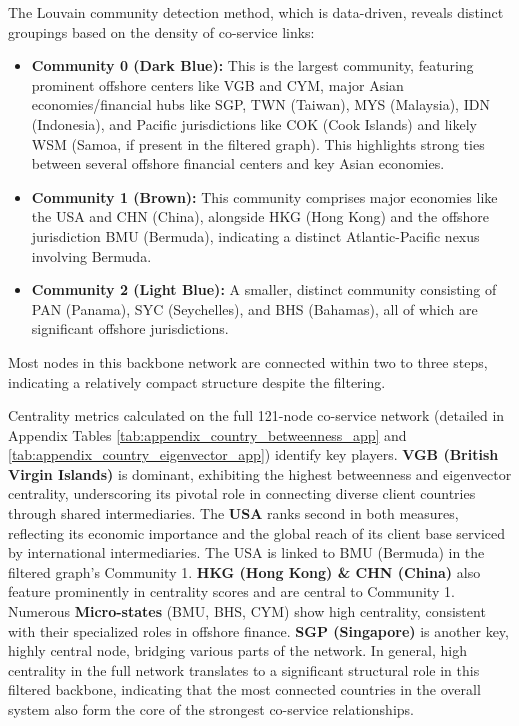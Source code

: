The Louvain community detection method, which is data-driven, reveals distinct groupings based on the density of co-service links:
\begin{itemize}
    \item \textbf{Community 0 (Dark Blue):} This is the largest community, featuring prominent offshore centers like VGB and CYM, major Asian economies/financial hubs like SGP, TWN (Taiwan), MYS (Malaysia), IDN (Indonesia), and Pacific jurisdictions like COK (Cook Islands) and likely WSM (Samoa, if present in the filtered graph). This highlights strong ties between several offshore financial centers and key Asian economies.
    \item \textbf{Community 1 (Brown):} This community comprises major economies like the USA and CHN (China), alongside HKG (Hong Kong) and the offshore jurisdiction BMU (Bermuda), indicating a distinct Atlantic-Pacific nexus involving Bermuda.
    \item \textbf{Community 2 (Light Blue):} A smaller, distinct community consisting of PAN (Panama), SYC (Seychelles), and BHS (Bahamas), all of which are significant offshore jurisdictions.
\end{itemize}
Most nodes in this backbone network are connected within two to three steps, indicating a relatively compact structure despite the filtering.

Centrality metrics calculated on the full 121-node co-service network (detailed in Appendix Tables \ref{tab:appendix_country_betweenness_app} and \ref{tab:appendix_country_eigenvector_app}) identify key players.
\textbf{VGB (British Virgin Islands)} is dominant, exhibiting the highest betweenness and eigenvector centrality, underscoring its pivotal role in connecting diverse client countries through shared intermediaries. The \textbf{USA} ranks second in both measures, reflecting its economic importance and the global reach of its client base serviced by international intermediaries. The USA is linked to BMU (Bermuda) in the filtered graph's Community 1. \textbf{HKG (Hong Kong) \& CHN (China)} also feature prominently in centrality scores and are central to Community 1. Numerous \textbf{Micro-states} (BMU, BHS, CYM) show high centrality, consistent with their specialized roles in offshore finance. \textbf{SGP (Singapore)} is another key, highly central node, bridging various parts of the network. In general, high centrality in the full network translates to a significant structural role in this filtered backbone, indicating that the most connected countries in the overall system also form the core of the strongest co-service relationships.

